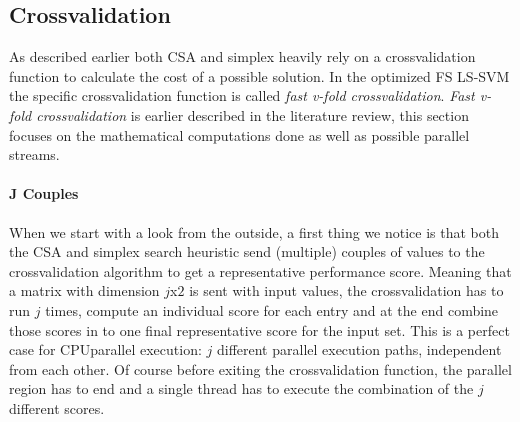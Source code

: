 \subsection{Crossvalidation}
As described earlier both CSA and simplex heavily rely on a crossvalidation function to calculate the cost of a possible solution.
In the optimized FS LS-SVM the specific crossvalidation function is called \textit{fast v-fold crossvalidation}.
\textit{Fast v-fold crossvalidation} is earlier described in the literature review, this section focuses on the mathematical computations done as well as possible parallel streams.
\paragraph{J Couples}
When we start with a look from the outside, a first thing we notice is that both the CSA and simplex search heuristic send (multiple) couples of values to the crossvalidation algorithm to get a representative performance score.
Meaning that a matrix with dimension $j$x$2$ is sent with input values, the crossvalidation has to run $j$ times, compute an individual score for each entry and at the end combine those scores in to one final representative score for the input set.
This is a perfect case for CPUparallel execution: $j$ different parallel execution paths, independent from each other. 
Of course before exiting the crossvalidation function, the parallel region has to end and a single thread has to execute the combination of the $j$ different scores.
